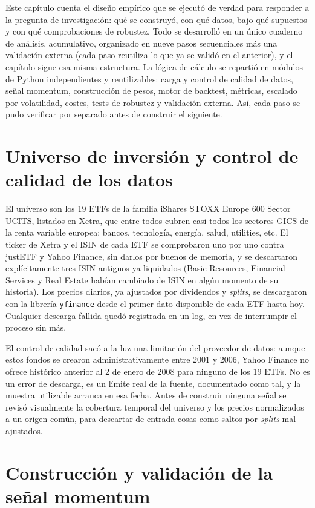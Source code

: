 \documentclass[12pt]{report} %
\begin{document}
Este capítulo cuenta el diseño empírico que se ejecutó de verdad para responder a la pregunta de investigación: qué se construyó, con qué datos, bajo qué supuestos y con qué comprobaciones de robustez. Todo se desarrolló en un único cuaderno de análisis, acumulativo, organizado en nueve pasos secuenciales más una validación externa (cada paso reutiliza lo que ya se validó en el anterior), y el capítulo sigue esa misma estructura. La lógica de cálculo se repartió en módulos de Python independientes y reutilizables: carga y control de calidad de datos, señal momentum, construcción de pesos, motor de backtest, métricas, escalado por volatilidad, costes, tests de robustez y validación externa. Así, cada paso se pudo verificar por separado antes de construir el siguiente.

\section{Universo de inversión y control de calidad de los datos}

El universo son los 19 ETFs de la familia iShares STOXX Europe 600 Sector UCITS, listados en Xetra, que entre todos cubren casi todos los sectores GICS de la renta variable europea: bancos, tecnología, energía, salud, utilities, etc. El ticker de Xetra y el ISIN de cada ETF se comprobaron uno por uno contra justETF y Yahoo Finance, sin darlos por buenos de memoria, y se descartaron explícitamente tres ISIN antiguos ya liquidados (Basic Resources, Financial Services y Real Estate habían cambiado de ISIN en algún momento de su historia). Los precios diarios, ya ajustados por dividendos y \textit{splits}, se descargaron con la librería \texttt{yfinance} desde el primer dato disponible de cada ETF hasta hoy. Cualquier descarga fallida quedó registrada en un log, en vez de interrumpir el proceso sin más.

El control de calidad sacó a la luz una limitación del proveedor de datos: aunque estos fondos se crearon administrativamente entre 2001 y 2006, Yahoo Finance no ofrece histórico anterior al 2 de enero de 2008 para ninguno de los 19 ETFs. No es un error de descarga, es un límite real de la fuente, documentado como tal, y la muestra utilizable arranca en esa fecha. Antes de construir ninguna señal se revisó visualmente la cobertura temporal del universo y los precios normalizados a un origen común, para descartar de entrada cosas como saltos por \textit{splits} mal ajustados.

\section{Construcción y validación de la señal momentum}
\end{document}
